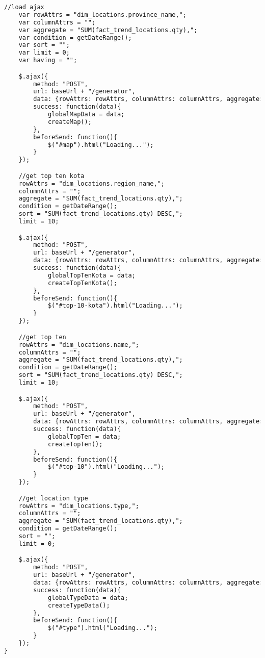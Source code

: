 \begin{lstlisting}[language=HTML,basicstyle=\tiny,caption=script-dashboard.js]
    //load ajax
    var rowAttrs = "dim_locations.province_name,";
    var columnAttrs = "";
    var aggregate = "SUM(fact_trend_locations.qty),";
    var condition = getDateRange();
    var sort = "";
    var limit = 0;
    var having = "";

    $.ajax({
        method: "POST",
        url: baseUrl + "/generator",
        data: {rowAttrs: rowAttrs, columnAttrs: columnAttrs, aggregate: aggregate, condition: condition, sort: sort, limit: limit, having: having, connectionId: 0, cubeId: 0},
        success: function(data){
            globalMapData = data;
            createMap();
        },
        beforeSend: function(){
            $("#map").html("Loading...");
        }
    });

    //get top ten kota
    rowAttrs = "dim_locations.region_name,";
    columnAttrs = "";
    aggregate = "SUM(fact_trend_locations.qty),";
    condition = getDateRange();
    sort = "SUM(fact_trend_locations.qty) DESC,";
    limit = 10;

    $.ajax({
        method: "POST",
        url: baseUrl + "/generator",
        data: {rowAttrs: rowAttrs, columnAttrs: columnAttrs, aggregate: aggregate, condition: condition, sort: sort, limit: limit, having: having, connectionId: 0, cubeId: 0},
        success: function(data){
            globalTopTenKota = data;
            createTopTenKota();
        },
        beforeSend: function(){
            $("#top-10-kota").html("Loading...");
        }
    });

    //get top ten
    rowAttrs = "dim_locations.name,";
    columnAttrs = "";
    aggregate = "SUM(fact_trend_locations.qty),";
    condition = getDateRange();
    sort = "SUM(fact_trend_locations.qty) DESC,";
    limit = 10;

    $.ajax({
        method: "POST",
        url: baseUrl + "/generator",
        data: {rowAttrs: rowAttrs, columnAttrs: columnAttrs, aggregate: aggregate, condition: condition, sort: sort, limit: limit, having: having, connectionId: 0, cubeId: 0},
        success: function(data){
            globalTopTen = data;
            createTopTen();
        },
        beforeSend: function(){
            $("#top-10").html("Loading...");
        }
    });

    //get location type
    rowAttrs = "dim_locations.type,";
    columnAttrs = "";
    aggregate = "SUM(fact_trend_locations.qty),";
    condition = getDateRange();
    sort = "";
    limit = 0;

    $.ajax({
        method: "POST",
        url: baseUrl + "/generator",
        data: {rowAttrs: rowAttrs, columnAttrs: columnAttrs, aggregate: aggregate, condition: condition, sort: sort, limit: limit, having: having, connectionId: 0, cubeId: 0},
        success: function(data){
            globalTypeData = data;
            createTypeData();
        },
        beforeSend: function(){
            $("#type").html("Loading...");
        }
    });
}


\end{lstlisting}
